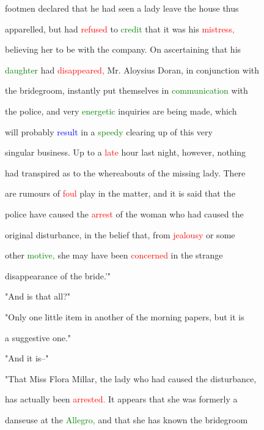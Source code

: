  footmen declared that he had seen a lady \textcolor{BurntOrange}{leave} the house thus

 apparelled, but had \textcolor{red}{refused} to \textcolor{green}{credit} that it was his \textcolor{red}{mistress,}

 believing her to be with the company. On ascertaining that his

 \textcolor{green}{daughter} had \textcolor{red}{disappeared,} Mr. Aloysius Doran, in conjunction with

 the \textcolor{BurntOrange}{bridegroom,} instantly put themselves in \textcolor{green}{communication} with

 the \textcolor{BurntOrange}{police,} and very \textcolor{green}{energetic} \textcolor{BurntOrange}{inquiries} are being made, which

 will probably \textcolor{blue}{result} in a \textcolor{green}{speedy} clearing up of this very

 singular business. Up to a \textcolor{red}{late} hour last night, however, nothing

 had transpired as to the whereabouts of the missing lady. There

 are rumours of \textcolor{red}{foul} play in the matter, and it is said that the

 \textcolor{BurntOrange}{police} have caused the \textcolor{red}{arrest} of the woman who had caused the

 original \textcolor{BurntOrange}{disturbance,} in the belief that, from \textcolor{red}{jealousy} or some

 other \textcolor{green}{motive,} she may have been \textcolor{red}{concerned} in the strange

 disappearance of the \textcolor{BurntOrange}{bride.'"}



 "And is that all?"



 "Only one little item in another of the morning papers, but it is

 a suggestive one."



 "And it is--"



 "That Miss Flora Millar, the lady who had caused the \textcolor{BurntOrange}{disturbance,}

 has actually been \textcolor{red}{arrested.} It appears that she was formerly a

 danseuse at the \textcolor{green}{Allegro,} and that she has known the \textcolor{BurntOrange}{bridegroom}

